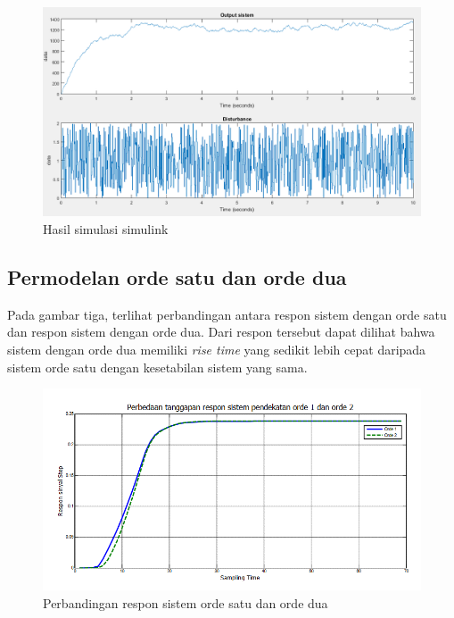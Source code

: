 \documentclass[12pt]{journal}
\begin{document}
\begin{figure}[H]
    \centering
    \includegraphics[width=\textwidth]{hasil_nomor_1.png}
    \caption{Hasil simulasi simulink}
    \label{soal_nomor_satul}
\end{figure}

\pagebreak

\subsection{Permodelan orde satu dan orde dua}

Pada gambar tiga, terlihat perbandingan antara respon sistem dengan orde satu dan respon sistem dengan orde dua. Dari respon tersebut dapat dilihat bahwa sistem dengan orde dua memiliki \textit{rise time} yang sedikit lebih cepat daripada sistem orde satu dengan kesetabilan sistem yang sama.

\begin{figure}[H]
    \centering
    \includegraphics[width = \textwidth]{soal_nomor_2.png}
    \caption{Perbandingan respon sistem orde satu dan orde dua}
    \label{hasil_nomor_satu}
\end{figure}
\end{document}
